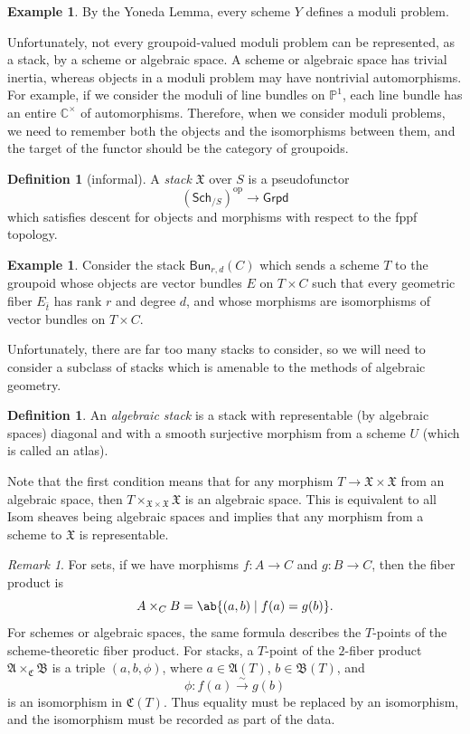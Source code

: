 \documentclass{amsart}
\theoremstyle{definition}
\newtheorem{defn}[thm]{Definition}
\newtheorem{exm}[thm]{Example}
\theoremstyle{remark}
\newtheorem{rmk}[thm]{Remark}
\theoremstyle{plain}
\theoremstyle{definition}
\theoremstyle{remark}
\newcommand{\C}{\mathbb{C}}
\renewcommand{\P}{\mathbb{P}}
\newcommand{\mf}[1]{\mathfrak{#1}}
\newcommand{\mr}[1]{\mathrm{#1}}
\newcommand{\ms}[1]{\mathsf{#1}}
\newcommand{\1}{\mathbf{1}}
\newcommand{\2}{\mathbf{2}}
\newcommand{\3}{\mathbf{3}}
\begin{document}
\begin{exm}
    By the Yoneda Lemma, every scheme \(Y\) defines a moduli problem.
\end{exm}

Unfortunately, not every groupoid-valued moduli problem can be represented, as a stack, by a scheme or algebraic space. A scheme or algebraic space has trivial inertia, whereas objects in a moduli problem may have nontrivial automorphisms. For example, if we consider the moduli of line bundles on \(\P^1\), each line bundle has an entire \(\C^{\times}\) of automorphisms. Therefore, when we consider moduli problems, we need to remember both the objects and the isomorphisms between them, and the target of the functor should be the category of groupoids.

\begin{defn}[informal]
    A \textit{stack} \(\mf{X}\) over \(S\) is a pseudofunctor
    \[ (\ms{Sch}_{/S})^{\mr{op}} \to \ms{Grpd} \]
    which satisfies descent for objects and morphisms with respect to the fppf topology.
\end{defn}

\begin{exm}
    Consider the stack \(\ms{Bun}_{r,d}(C)\) which sends a scheme \(T\) to the groupoid whose objects are vector bundles \(E\) on \(T\times C\) such that every geometric fiber \(E_{\bar t}\) has rank \(r\) and degree \(d\), and whose morphisms are isomorphisms of vector bundles on \(T\times C\).
\end{exm}

Unfortunately, there are far too many stacks to consider, so we will need to consider a subclass of stacks which is amenable to the methods of algebraic geometry.

\begin{defn}
    An \textit{algebraic stack} is a stack with representable (by algebraic spaces) diagonal and with a smooth surjective morphism from a scheme \(U\) (which is called an atlas). 
\end{defn}

Note that the first condition means that for any morphism \(T \to \mf{X} \times \mf{X}\) from an algebraic space, then \(T \times_{\mf{X} \times \mf{X}} \mf{X}\) is an algebraic space. This is equivalent to all Isom sheaves being algebraic spaces and implies that any morphism from a scheme to \(\mf{X}\) is representable.

\begin{rmk}
    For sets, if we have morphisms \(f\colon A\to C\) and \(g\colon B\to C\), then the fiber product is
    \[ 
        A\times_C B=\ab\{(a,b)\mid f(a)=g(b)\}. 
    \] 
    For schemes or algebraic spaces, the same formula describes the \(T\)-points of the scheme-theoretic fiber product. For stacks, a \(T\)-point of the \(2\)-fiber product \(\mf{A}\times_{\mf{C}}\mf{B}\) is a triple \((a,b,\phi)\), where \(a\in\mf{A}(T)\), \(b\in\mf{B}(T)\), and
    \[ 
        \phi\colon f(a)\xrightarrow{\sim}g(b) 
    \]
    is an isomorphism in \(\mf{C}(T)\). Thus equality must be replaced by an isomorphism, and the isomorphism must be recorded as part of the data.
\end{rmk}
\end{document}
